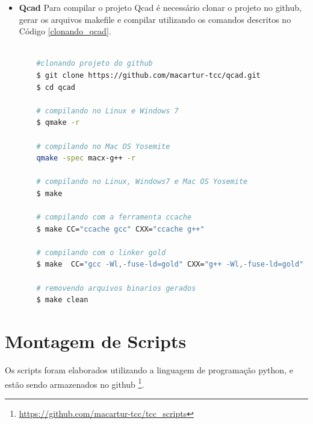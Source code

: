 \begin{itemize}
\begin{lstlisting}[language=bash, caption={Clonado Projeto Aseprite e criando diretório de Compilação},
                  label=clonando_aseprite]
    # compilando projeto com ccache no Mac OS Yosemite
    $ cmake -G .. "Unix Makefiles"  -DCMAKE_CXX_COMPILER="ccache"  -DCMAKE_CXX_COMPILER_ARG1="g++" -DCMAKE_C_COMPILER="ccache" -DCMAKE_C_COMPILER_ARG1="gcc"  -DCMAKE_OSX_ARCHITECTURES:STRING=i386  -DCMAKE_OSX_DEPLOYMENT_TARGET:STRING=10.4  -DCMAKE_OSX_SYSROOT:STRING=/SDKs/MacOSX10.4u.sdk

    # compilando com o linker gold no Linux
    $ CC="gcc  -Wl,-fuse-ld=gold" CXX="g++ -Wl,-fuse-ld=gold" cmake .. -G "Unix Makefiles"

    # removendo arquivos binarios
    $ make clean

\end{lstlisting}

    \item \textbf{Qcad}
    \subitem Para compilar o projeto Qcad é necessário clonar o
 projeto no github, gerar os arquivos makefile e compilar
 utilizando os comandos descritos no Código \ref{clonando_qcad}.

\begin{lstlisting}[language=bash, caption={Clonado Projeto Qcad},
                  label=clonando_qcad]

    #clonando projeto do github
    $ git clone https://github.com/macartur-tcc/qcad.git
    $ cd qcad

    # compilando no Linux e Windows 7
    $ qmake -r
    
    # compilando no Mac OS Yosemite
    qmake -spec macx-g++ -r

    # compilando no Linux, Windows7 e Mac OS Yosemite
    $ make

    # compilando com a ferramenta ccache
    $ make CC="ccache gcc" CXX="ccache g++"

    # compilando com o linker gold
    $ make  CC="gcc -Wl,-fuse-ld=gold" CXX="g++ -Wl,-fuse-ld=gold"

    # removendo arquivos binarios gerados
    $ make clean

\end{lstlisting}
\end{itemize}

\section{Montagem de Scripts}


Os scripts foram elaborados utilizando a linguagem de programação python,
 e estão sendo armazenados no github
\footnote{\url{https://github.com/macartur-tcc/tcc_scripts}}.


